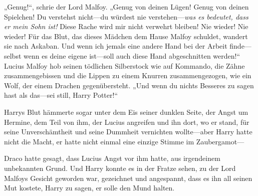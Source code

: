 „Genug!“, schrie der Lord Malfoy. „Genug von deinen Lügen! Genug von deinen Spielchen! Du verstehst nicht—du würdest nie verstehen—\emph{was es bedeutet, dass er mein Sohn ist!} Diese Rache wird mir nicht verwehrt bleiben! Nie wieder! Nie wieder! Für das Blut, das dieses Mädchen dem Hause Malfoy schuldet, wandert sie nach Askaban. Und wenn ich jemals eine andere Hand bei der Arbeit finde—selbst wenn es deine eigene ist—soll auch diese Hand abgeschnitten werden!“
Lucius Malfoy hob seinen tödlichen Silberstock wie auf Kommando, die Zähne zusammengebissen und die Lippen zu einem Knurren zusammengezogen, wie ein Wolf, der einem Drachen gegenübersteht.
„Und wenn du nichts Besseres zu sagen hast als das—sei still, Harry Potter!“

\later

Harrys Blut hämmerte sogar unter dem Eis seiner dunklen Seite, der Angst um Hermine, dem Teil von ihm, der Lucius angreifen und ihn dort, wo er stand, für seine Unverschämtheit und seine Dummheit vernichten wollte—aber Harry hatte nicht die Macht, er hatte nicht einmal eine einzige Stimme im Zaubergamot—

Draco hatte gesagt, dass Lucius Angst vor ihm hatte, aus irgendeinem unbekannten Grund. Und Harry konnte es in der Fratze sehen, zu der Lord Malfoys Gesicht geworden war, gezeichnet und angespannt, dass es ihn all seinen Mut kostete, Harry zu sagen, er solle den Mund halten.

